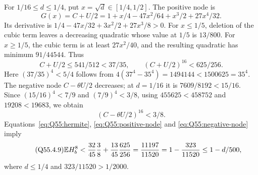 For $1/16\le\allowbreak  d\le\allowbreak 1/4$, put $x=\allowbreak \sqrt d\in[1/4,\allowbreak 1/2]$. The positive node is
\[
 G(x)=C+U/2=1+x/4-47x^2/64+x^3/2+27x^4/32.
\]
Its derivative is $1/4-47x/32+3x^2/2+27x^3/8>\allowbreak 0$.
For $x\le\allowbreak 1/5$, deletion of the cubic term leaves a decreasing quadratic
whose value at $1/5$ is $13/800$. For $x\ge\allowbreak 1/5$, the cubic term is at
least $27x^2/40$, and the resulting quadratic has minimum $91/44544$.
Thus
\begin{equation}\tag{Q55.4.7}\label{eq:Q55:positive-node}
 C+U/2\le541/512<37/35,\qquad(C+U/2)^{16}<625/256.
\end{equation}
Here $(37/35)^4<\allowbreak 5/4$ follows from
$4(37^4-35^4)=\allowbreak 1494144<\allowbreak 1500625=\allowbreak 35^4$.
The negative node $C-\theta U/2$ decreases; at $d=\allowbreak 1/16$ it is
$7609/8192<\allowbreak 15/16$. Since $(15/16)^4<\allowbreak 7/9$ and $(7/9)^4<\allowbreak 3/8$,
using $455625<\allowbreak 458752$ and $19208<\allowbreak 19683$, we obtain
\begin{equation}\tag{Q55.4.8}\label{eq:Q55:negative-node}
 (C-\theta U/2)^{16}<3/8.
\end{equation}
Equations~\eqref{eq:Q55:hermite}, \eqref{eq:Q55:positive-node} and
\eqref{eq:Q55:negative-node} imply
\begin{equation}\tag{Q55.4.9}\label{eq:Q55:middle}
 \mathbb E H_b^8<\frac{32}{45}\frac38+\frac{13}{45}\frac{625}{256}
 =\frac{11197}{11520}=1-\frac{323}{11520}\le1-d/500,
\end{equation}
where $d\le\allowbreak 1/4$ and $323/11520>\allowbreak 1/2000$.

